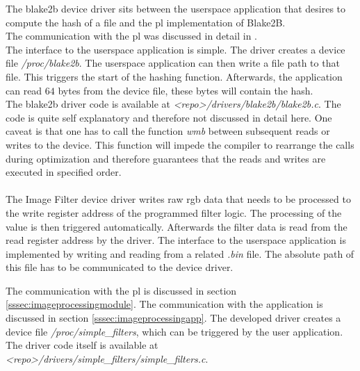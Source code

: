 
The blake2b device driver sits between the userspace application that desires to
compute the hash of a file and the \gls{pl} implementation of Blake2B.\\
The communication with the \gls{pl} was discussed in detail in
.\\
The interface to the userspace application is simple.
The driver creates a device file \emph{/proc/blake2b}.
The userspace application can then write a file path to that file.
This triggers the start of the hashing function.
Afterwards, the application can read $64$ bytes from the device file, these
bytes will contain the hash.\\
The blake2b driver code is available at \emph{<repo>/drivers/blake2b/blake2b.c}.
The code is quite self explanatory and therefore not discussed in detail here.
One caveat is that one has to call the function \emph{wmb} between subsequent
reads or writes to the device.
This function will impede the compiler to rearrange the calls during
optimization and therefore guarantees that the reads and writes are executed in
specified order.
\\\\
The Image Filter device driver writes raw \gls{rgb} data that needs to be
processed to the write register address of the programmed filter logic.
The processing of the value is then triggered automatically.
Afterwards the filter data is read from the read register address by the driver.
The interface to the userspace application is implemented by writing and reading
from a related \emph{.bin} file.
The absolute path of this file has to be communicated to the device driver.

The communication with the \gls{pl} is discussed in section
\ref{sssec:imageprocessingmodule}.
The communication with the application is discussed in section
\ref{sssec:imageprocessingapp}.
The developed driver creates a device file \emph{/proc/simple\_filters}, which
can be triggered by the user application.
The driver code itself is available at\\
\emph{<repo>/drivers/simple\_filters/simple\_filters.c}.
